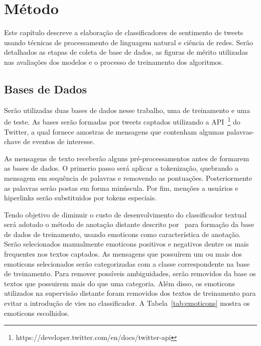 \chapter{Método}
\label{chapter:method}

Este capítulo descreve a elaboração de classificadores de sentimento de tweets
usando técnicas de processamento de linguagem natural e ciência de redes.
Serão detalhados as etapas de coleta de base de dados, as figuras de mérito
utilizadas nas avaliações dos modelos e o processo de treinamento dos
algoritmos.

\section{Bases de Dados}

Serão utilizadas duas bases de dados nesse trabalho, uma de treinamento e uma de
teste.
As bases serão formadas por tweets captados utilizando a
API~\footnote{https://developer.twitter.com/en/docs/twitter-api} do Twitter,
a qual fornece amostras de mensagens que contenham algumas palavras-chave
de eventos de interesse.

As mensagens de texto receberão alguns pré-processamentos antes de formarem as
bases de dados.
O primerio passo será aplicar a tokenização, quebrando a mensagem em sequência
de palavras e removendo as pontuações.
Posteriormente as palavras serão postas em forma minúscula.
Por fim, menções a usuários e hiperlinks serão substituidos por tokens especiais.

Tendo objetivo de diminuir o custo de desenvolvimento do classificador textual será
adotado o método de anotação distante descrito por~\citet{go09} para formação da
base de dados de treinamento, usando emoticons como característica de anotação.
Serão selecionados manualmente emoticons positivos e negativos dentre os mais
frequentes nos textos captados.
As mensagens que possuírem um ou mais dos emoticons selecionados serão
categorizadas com a classe correspondente na base de treinamento.
Para remover possíveis ambiguidades, serão removidos da base os textos que
possuirem mais do que uma categoria.
Além disso, os emoticons utilizados na supervisão distante foram removidos dos
textos de treinamento para evitar a introdução de vies no classificador.
A Tabela~\ref{tab:emoticons} mostra os emoticons escolhidos.

